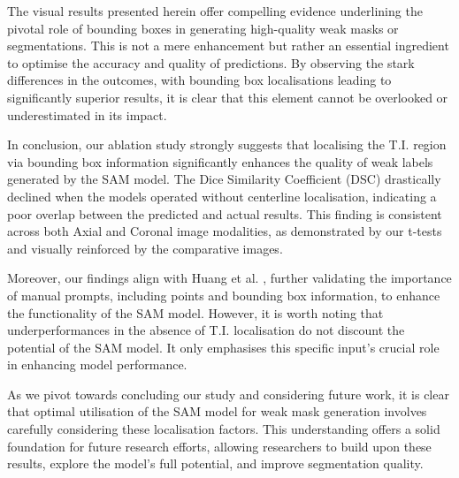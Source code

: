 The visual results presented herein offer compelling evidence underlining the pivotal role of bounding boxes in generating high-quality weak masks or segmentations. This is not a mere enhancement but rather an essential ingredient to optimise the accuracy and quality of predictions. By observing the stark differences in the outcomes, with bounding box localisations leading to significantly superior results, it is clear that this element cannot be overlooked or underestimated in its impact.

In conclusion, our ablation study strongly suggests that localising the T.I. region via bounding box information significantly enhances the quality of weak labels generated by the SAM model. The Dice Similarity Coefficient (DSC) drastically declined when the models operated without centerline localisation, indicating a poor overlap between the predicted and actual results. This finding is consistent across both Axial and Coronal image modalities, as demonstrated by our t-tests and visually reinforced by the comparative images.

Moreover, our findings align with Huang et al. \cite{huang2023segment}, further validating the importance of manual prompts, including points and bounding box information, to enhance the functionality of the SAM model. However, it is worth noting that underperformances in the absence of T.I. localisation do not discount the potential of the SAM model. It only emphasises this specific input's crucial role in enhancing model performance.

As we pivot towards concluding our study and considering future work, it is clear that optimal utilisation of the SAM model for weak mask generation involves carefully considering these localisation factors. This understanding offers a solid foundation for future research efforts, allowing researchers to build upon these results, explore the model's full potential, and improve segmentation quality.